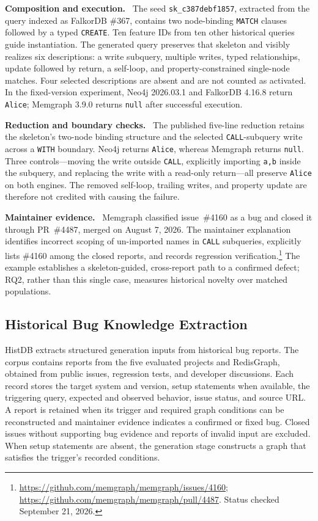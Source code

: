\documentclass[acmsmall,screen,anonymous]{acmart}
\newcommand{\cnpara}[1]{\par\noindent\textbf{#1.}\ }
\begin{document}
\cnpara{Composition and execution}
The seed \texttt{sk\_c387debf1857}, extracted from the query indexed as FalkorDB \#367, contains two node-binding \lstinline|MATCH| clauses followed by a typed \lstinline|CREATE|. Ten feature IDs from ten other historical queries guide instantiation. The generated query preserves that skeleton and visibly realizes six descriptions: a write subquery, multiple writes, typed relationships, update followed by return, a self-loop, and property-constrained single-node matches. Four selected descriptions are absent and are not counted as activated. In the fixed-version experiment, Neo4j 2026.03.1 and FalkorDB 4.16.8 return \texttt{Alice}; Memgraph 3.9.0 returns \texttt{null} after successful execution.

\cnpara{Reduction and boundary checks}
The published five-line reduction retains the skeleton's two-node binding structure and the selected \lstinline|CALL|-subquery write across a \lstinline|WITH| boundary. Neo4j returns \texttt{Alice}, whereas Memgraph returns \texttt{null}. Three controls---moving the write outside \lstinline|CALL|, explicitly importing \texttt{a,b} inside the subquery, and replacing the write with a read-only return---all preserve \texttt{Alice} on both engines. The removed self-loop, trailing writes, and property update are therefore not credited with causing the failure.

\cnpara{Maintainer evidence}
Memgraph classified issue~\#4160 as a bug and closed it through PR~\#4487, merged on August 7, 2026. The maintainer explanation identifies incorrect scoping of un-imported names in \lstinline|CALL| subqueries, explicitly lists \#4160 among the closed reports, and records regression verification.\footnote{\url{https://github.com/memgraph/memgraph/issues/4160}; \url{https://github.com/memgraph/memgraph/pull/4487}. Status checked September 21, 2026.} The example establishes a skeleton-guided, cross-report path to a confirmed defect; RQ2, rather than this single case, measures historical novelty over matched populations.

\subsection{Historical Bug Knowledge Extraction}
\label{sec:knowledge-extraction}

HistDB extracts structured generation inputs from historical bug reports. The corpus contains reports from the five evaluated projects and RedisGraph, obtained from public issues, regression tests, and developer discussions. Each record stores the target system and version, setup statements when available, the triggering query, expected and observed behavior, issue status, and source URL. A report is retained when its trigger and required graph conditions can be reconstructed and maintainer evidence indicates a confirmed or fixed bug. Closed issues without supporting bug evidence and reports of invalid input are excluded. When setup statements are absent, the generation stage constructs a graph that satisfies the trigger's recorded conditions.
\end{document}

